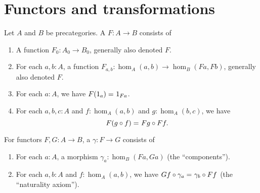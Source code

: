 \documentclass[hott-all.tex]{subfiles}
\begin{document}
\section{Functors and transformations}


\begin{defn}
  Let $A$ and $B$ be precategories.
  A 
  $F:A\to B$ consists of
  \begin{enumerate}
  \item A function $F_0:A_0\to B_0$, generally also denoted $F$.
  \item For each $a,b:A$, a function $F_{a,b}:\hom_A(a,b) \to \hom_B(Fa,Fb)$, generally also denoted $F$.
  \item For each $a:A$, we have $F(1_a) =_{} 1_{Fa}$.
  \item For each $a,b,c:A$ and $f:\hom_A(a,b)$ and $g:\hom_A(b,c)$, we have
    \[F(g\circ f) =_{} Fg\circ Ff.\]
  \end{enumerate}
\end{defn}


\begin{defn}
  For functors $F,G:A\to B$, a 
  $\gamma:F\to G$ consists of
  \begin{enumerate}
  \item For each $a:A$, a morphism $\gamma_a:\hom_B(Fa,Ga)$ (the ``components'').
  \item For each $a,b:A$ and $f:\hom_A(a,b)$, we have $Gf\circ \gamma_a =_{} \gamma_b\circ Ff$ (the ``naturality axiom'').
  \end{enumerate}
\end{defn}

%
\end{document}
